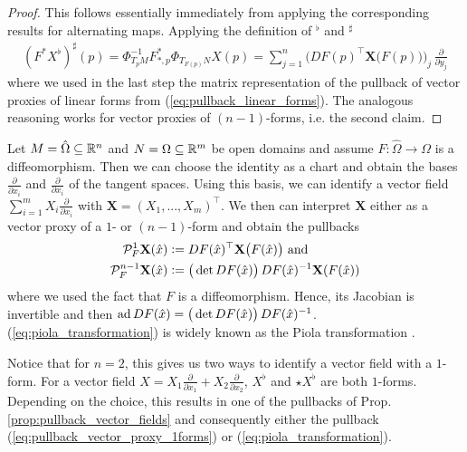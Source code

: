 \documentclass[../master_thesis.tex]{subfiles}
\begin{document}
\begin{proof}
    This follows essentially immediately from applying the 
    corresponding results for alternating maps. Applying the definition of 
    $^\flat$ and $^\sharp$
    \begin{align*}
        (F^* X^\flat)^\sharp(p)
        = \Phi^{-1}_{T_p M} F_{*,p}^* \Phi_{T_{F(p)}N} X(p)
        = \sum_{j=1}^n \Big( DF(p)^\top \mathbf{X}\big( F(p) \big) \Big)_j \,\frac{\partial}{\partial y_j}
    \end{align*}
    where we used in the last step the matrix representation of the pullback of vector proxies
    of linear forms from (\ref{eq:pullback_linear_forms}). The analogous reasoning works 
    for vector proxies of $(n-1)$-forms, i.e. the second claim.
\end{proof}

Let $M = \hat{\Omega} \subseteq \mathbb{R}^n$ and $N = \Omega \subseteq \mathbb{R}^m$ be open domains and assume 
$F: \hat{\Omega} \rightarrow \Omega$ is a diffeomorphism. Then we can choose the identity as a chart and obtain 
the bases $\frac{\partial}{\partial \hat{x}_i}$ and $\frac{\partial}{\partial x_i}$ of the tangent spaces.
Using this basis, we 
can identify a vector field $\sum_{i=1}^m X_i \frac{\partial}{\partial x_i}$
with $\mathbf{X} = (X_1,...,X_m)^\top$. We then can interpret $\mathbf{X}$ 
either as a vector proxy of a $1$- or $(n-1)$-form and obtain the pullbacks
\begin{align}
    \mathcal{P}^1_F \mathbf{X}(\hat{x}) &\vcentcolon= DF(\hat{x})^\top \mathbf{X}\big(F(\hat{x}) \big) 
    \text{ and} \label{eq:pullback_vector_proxy_1forms}
    \\ \mathcal{P}^{n-1}_F \mathbf{X}(\hat{x}) &\vcentcolon= \big(\det DF(\hat{x})\big)\,
        DF(\hat{x})^{-1} \mathbf{X}(F(\hat{x}))\label{eq:piola_transformation}
\end{align}
where we used the fact that $F$ is a diffeomorphism. Hence, its Jacobian 
is invertible and then $\operatorname{ad} DF(\hat{x}) = \big(\det DF(\hat{x})\big)\,
DF(\hat{x})^{-1}$.
(\ref{eq:piola_transformation}) is widely known as the Piola transformation \cite[Def.\,9.8]{ern_guermond}.

\begin{remark}\label{rem:vector_proxies_differential_forms_2d}
    Notice that for $n=2$, this gives us two ways to identify a vector field with a $1$-form. 
    For a vector field $X = X_1 \frac{\partial}{\partial x_1} + X_2 \frac{\partial}{\partial x_2}$, 
    $X^\flat$ and $\star X^\flat$ are both $1$-forms. 
    Depending on the choice, this results in one of the pullbacks of 
    Prop.\,\ref{prop:pullback_vector_fields} and consequently either the pullback 
    (\ref{eq:pullback_vector_proxy_1forms}) or (\ref{eq:piola_transformation}).
\end{remark}
\end{document}
